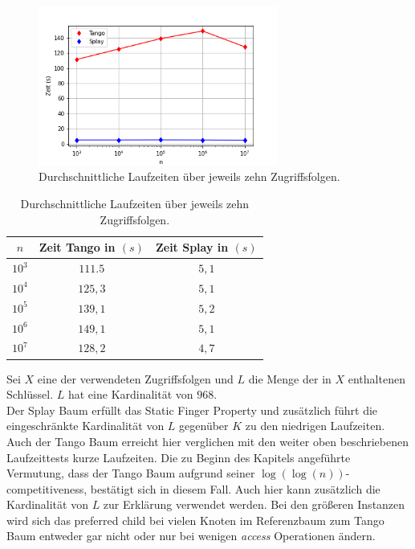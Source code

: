 \documentclass[a4paper,12pt]{article}
\begin{document}
\begin{figure}[H]
	\centering
	\includegraphics[width=0.7\textwidth]{Medien/laufzeittest/diagramm/staticfinger3}
	\caption{Durchschnittliche Laufzeiten über jeweils zehn Zugriffsfolgen.}
\end{figure}
\begin{table}[H]
	\begin{center}
		\begin{tabular}[c]{|c|c|c|}
			\hline
		$n$ & Zeit Tango in $\left(s\right)$ &Zeit Splay in $\left(s\right)$ \\
		\hline
		$10^3$ & $111.5$ &$5,1$ \\
		\hline
		$10^4$  & $125,3$ &$5,1$  \\
		\hline
		$10^5$  & $139,1$ &  $5,2$  \\
		\hline
		$10^6$  & $149,1$ &$5,1$  \\
		\hline
		$10^7$  & $128,2$ &$4,7$  \\
		\hline
		\end{tabular}
		\caption{Durchschnittliche Laufzeiten über jeweils zehn Zugriffsfolgen.} 
	\end{center}
\end{table}
\noindent Sei $X$ eine der verwendeten Zugriffsfolgen und $L$ die Menge der in $X$ enthaltenen Schlüssel. $L$ hat eine Kardinalität von $968$. \\
Der Splay Baum erfüllt das Static Finger Property und zusätzlich führt die eingeschränkte Kardinalität von  $L$ gegenüber $K$ zu den niedrigen Laufzeiten.     
Auch der Tango Baum erreicht hier verglichen mit den weiter oben beschriebenen Laufzeittests kurze Laufzeiten. Die zu Beginn des Kapitels angeführte Vermutung, dass der Tango Baum aufgrund seiner $\log\left(\log\left(n\right)\right)$-competitiveness, bestätigt sich in diesem Fall. Auch hier kann zusätzlich die Kardinalität von $L$ zur Erklärung verwendet werden. Bei den größeren Instanzen wird sich das preferred child bei vielen Knoten im Referenzbaum zum Tango Baum entweder gar nicht oder nur bei wenigen \textit{access} Operationen ändern. \\
\end{document}
